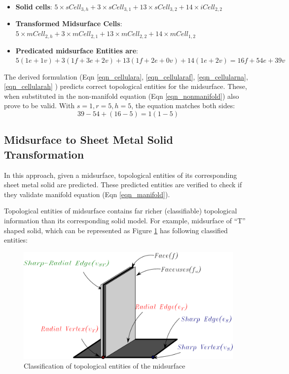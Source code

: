 \begin{itemize}
[noitemsep,topsep=2pt,parsep=2pt,partopsep=2pt,leftmargin=*]
	\item \textbf {Solid cells}: \newline  $5 \times sCell_{3,h} + 3 \times sCell_{3,1} + 13 \times sCell_{3,2} + 14 \times iCell_{2,2} $
	\item \textbf {Transformed Midsurface Cells}: \newline $5 \times mCell_{2,h} + 3 \times mCell_{2,1} + 13 \times mCell_{2,2} + 14 \times mCell_{1,2}$
	\item \textbf {Predicated midsurface Entities are}:  \newline $5(1e+1v) + 3 (1f+3e+2v) + 13 (1f+2e+0v) + 14(1e+2v) = 
16f + 54e + 39v$
\end{itemize}

The derived formulation (Eqn   \ref{eqn_cellulara}, \ref{eqn_cellularaf}, \ref{eqn_cellularna}, \ref{eqn_cellularah} ) predicts correct topological entities for the midsurface. These, when substituted in the non-manifold equation (Eqn \ref{eqn_nonmanifold}) also prove to be valid. With $s=1, r=5, h=5$, the equation matches both sides:
$$ 39 - 54 + (16 -5) = 1 (1-5)$$


\subsection{Midsurface to Sheet Metal Solid Transformation}
In this approach, given a midsurface, topological entities  of its corresponding sheet metal solid are predicted. These predicted entities are verified to check if they validate manifold equation (Eqn \ref{eqn_manifold}).

Topological entities of midsurface contains far richer (classifiable) topological information than its corresponding solid model. For example, midsurface of ``T'' shaped solid, which can be represented as Figure \ref{fig_nonmanifold} has following classified entities:

\begin{figure}[htbp]
\begin{center}
\includegraphics[width=0.6\linewidth]{../Common/images/NonManifoldT1.pdf} 
\end{center}
\caption{Classification of topological entities of the midsurface}
\label{fig_nonmanifold}
\end{figure}

